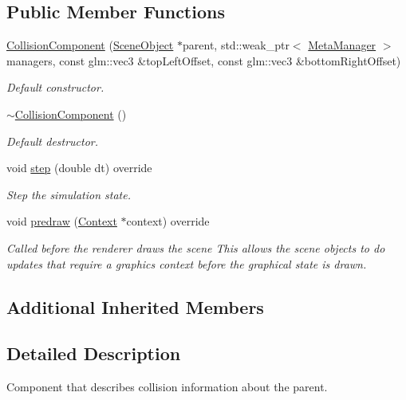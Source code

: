 \subsection*{Public Member Functions}
\begin{DoxyCompactItemize}
\item 
\hyperlink{class_collision_component_a9fdf81792f07764fd9ee5d1c963aaff4}{Collision\+Component} (\hyperlink{class_scene_object}{Scene\+Object} $\ast$parent, std\+::weak\+\_\+ptr$<$ \hyperlink{class_meta_manager}{Meta\+Manager} $>$ managers, const glm\+::vec3 \&top\+Left\+Offset, const glm\+::vec3 \&bottom\+Right\+Offset)
\begin{DoxyCompactList}\small\item\em Default constructor. \end{DoxyCompactList}\item 
\hyperlink{class_collision_component_a8927f6bcecb9862b870426af970ab3b7}{$\sim$\+Collision\+Component} ()
\begin{DoxyCompactList}\small\item\em Default destructor. \end{DoxyCompactList}\item 
void \hyperlink{class_collision_component_aee9d681edd938781127af2249b750125}{step} (double dt) override
\begin{DoxyCompactList}\small\item\em Step the simulation state. \end{DoxyCompactList}\item 
void \hyperlink{class_collision_component_a322c2d4550aef70b8284465ae34278db}{predraw} (\hyperlink{class_context}{Context} $\ast$context) override
\begin{DoxyCompactList}\small\item\em Called before the renderer draws the scene This allows the scene objects to do updates that require a graphics context before the graphical state is drawn. \end{DoxyCompactList}\end{DoxyCompactItemize}
\subsection*{Additional Inherited Members}


\subsection{Detailed Description}
Component that describes collision information about the parent. 

